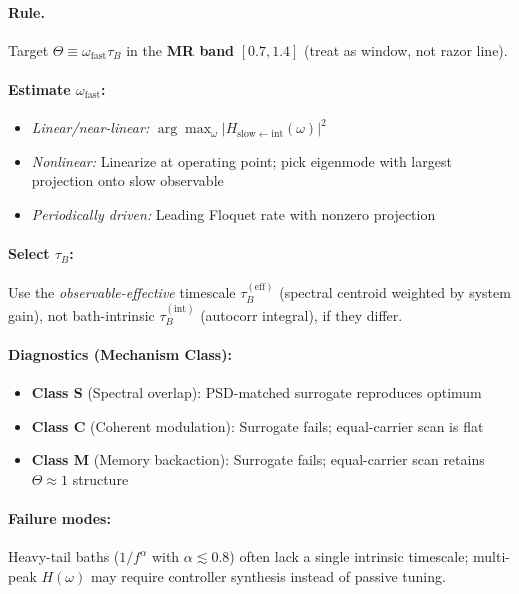\documentclass[11pt,letterpaper]{article}
\begin{document}
\begin{tcolorbox}[colback=blue!5!white,colframe=blue!75!black,title=Design Card: Memory-Resonance Condition ($\Theta \approx 1$)]

\paragraph*{Rule.} Target $\Theta \equiv \omega_{\mathrm{fast}} \tau_B$ in the \textbf{MR band} $[0.7, 1.4]$ (treat as window, not razor line).

\paragraph*{Estimate $\omega_{\mathrm{fast}}$:}
\begin{itemize}[nosep,leftmargin=*]
\item \emph{Linear/near-linear:} $\arg\max_\omega |H_{\mathrm{slow}\leftarrow\mathrm{int}}(\omega)|^2$
\item \emph{Nonlinear:} Linearize at operating point; pick eigenmode with largest projection onto slow observable
\item \emph{Periodically driven:} Leading Floquet rate with nonzero projection
\end{itemize}

\paragraph*{Select $\tau_B$:}
Use the \emph{observable-effective} timescale $\tau_B^{(\mathrm{eff})}$ (spectral centroid weighted by system gain), not bath-intrinsic $\tau_B^{(\mathrm{int})}$ (autocorr integral), if they differ.

\paragraph*{Diagnostics (Mechanism Class):}
\begin{itemize}[nosep,leftmargin=*]
\item \textbf{Class S} (Spectral overlap): PSD-matched surrogate reproduces optimum
\item \textbf{Class C} (Coherent modulation): Surrogate fails; equal-carrier scan is flat
\item \textbf{Class M} (Memory backaction): Surrogate fails; equal-carrier scan retains $\Theta\!\approx\!1$ structure
\end{itemize}

\paragraph*{Failure modes:}
Heavy-tail baths ($1/f^\alpha$ with $\alpha\!\lesssim\!0.8$) often lack a single intrinsic timescale; multi-peak $H(\omega)$ may require controller synthesis instead of passive tuning.


\end{tcolorbox}
\end{document}
